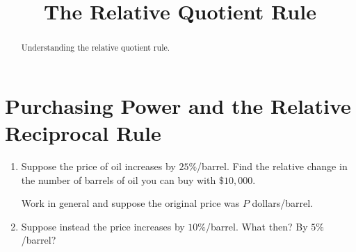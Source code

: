 \documentclass{ximera}
\title{The Relative Quotient Rule}
\begin{document}
\begin{abstract}
Understanding the relative quotient rule.
\end{abstract}
\maketitle

\section{Purchasing Power and the Relative Reciprocal Rule}


\begin{question} \label{Qdfr3r0z0cx}
\begin{enumerate}
\item Suppose the price of oil increases by $25\%$/barrel. Find the relative change in the number of barrels of oil you can buy with $\$10,000$.

Work in general and suppose the original price was $P$ dollars/barrel.

\item Suppose instead the price increases by $10\%$/barrel. What then? By $5\%$/barrel?

\end{enumerate}
\end{question}
\end{document}
